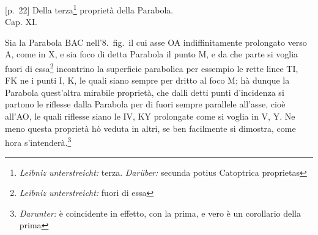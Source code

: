                 \vspace*{8mm}
                \pstart 
                \normalsize
            \begin{center} [p.~22] Della terza\footnote{\textit{Leibniz unterstreicht:} terza. \textit{Dar\"{u}ber:} secunda potius Catoptrica proprietas} propriet\`{a} della Parabola.\\Cap. XI.\end{center} \pend \vspace{1.0ex}\pstart Sia la Parabola BAC nell'8.\ fig.\ il cui asse OA indiffinitamente prolongato verso A, come in X, e sia foco\protect{} di detta Parabola il punto M, e da che parte si voglia fuori di essa\footnote{\textit{Leibniz unterstreicht:} fuori di essa} incontrino la superficie parabolica per essempio le rette linee TI, FK ne i punti I, K, le quali siano sempre per dritto al foco\protect{} M; h\`{a} dunque la Parabola quest'altra mirabile propriet\`{a}, che dalli detti punti d'incidenza si partono le riflesse\protect{} dalla Parabola per di fuori sempre parallele all'asse, cio\`{e} all'AO, le quali riflesse\protect{} siano le IV, KY prolongate come si voglia in V, Y. Ne meno questa propriet\`{a} h\`{o} veduta in altri, se ben facilmente si dimostra, come hora s'intender\`{a}.\footnote{\textit{Darunter:} \`{e} coincidente in effetto, con la prima, e vero \`{e} un corollario della prima}\pend \newpage